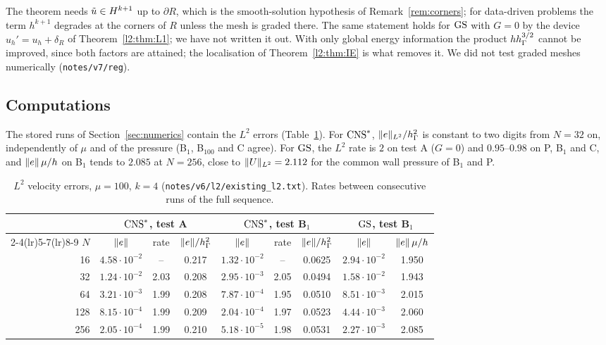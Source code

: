The theorem needs $\tilde u\in H^{k+1}$ up to $\partial R$, which is the smooth-solution hypothesis of Remark~\ref{rem:corners}; for data-driven problems the term $h^{k+1}$ degrades at the corners of $R$ unless the mesh is graded there. The same statement holds for $\mathrm{GS}$ with $G=0$ by the device $u_h'=u_h+\delta_R$ of Theorem~\ref{l2:thm:L1}; we have not written it out. With only global energy information the product $hh_\Gamma^{3/2}$ cannot be improved, since both factors are attained; the localisation of Theorem~\ref{l2:thm:IE} is what removes it. We did not test graded meshes numerically (\texttt{notes/v7/reg}).

\subsection{Computations}\label{l2:sec:num}

The stored runs of Section~\ref{sec:numerics} contain the $L^2$ errors (Table~\ref{l2:tab}). For $\mathrm{CNS}^\ast$, $\lVert e\rVert_{L^2}/h_\Gamma^2$ is constant to two digits from $N=32$ on, independently of $\mu$ and of the pressure (B$_1$, B$_{100}$ and C agree). For $\mathrm{GS}$, the $L^2$ rate is $2$ on test A ($G=0$) and $0.95$--$0.98$ on P, B$_1$ and C, and $\lVert e\rVert\,\mu/h$ on B$_1$ tends to $2.085$ at $N=256$, close to $\lVert U\rVert_{L^2}=2.112$ for the common wall pressure of B$_1$ and P.

\begin{table}[t]
\centering\small
\caption{$L^2$ velocity errors, $\mu=100$, $k=4$ (\texttt{notes/v6/l2/existing\_l2.txt}). Rates between consecutive runs of the full sequence.}\label{l2:tab}
\begin{tabular}{rcccccccc}
\toprule
 & \multicolumn{3}{c}{$\mathrm{CNS}^\ast$, test A} & \multicolumn{3}{c}{$\mathrm{CNS}^\ast$, test B$_1$} & \multicolumn{2}{c}{$\mathrm{GS}$, test B$_1$}\\
\cmidrule(lr){2-4}\cmidrule(lr){5-7}\cmidrule(lr){8-9}
$N$ & $\lVert e\rVert$ & rate & $\lVert e\rVert/h_\Gamma^2$ & $\lVert e\rVert$ & rate & $\lVert e\rVert/h_\Gamma^2$ & $\lVert e\rVert$ & $\lVert e\rVert\,\mu/h$\\
\midrule
16 & $4.58\cdot10^{-2}$ & -- & 0.217 & $1.32\cdot10^{-2}$ & -- & 0.0625 & $2.94\cdot10^{-2}$ & 1.950\\
32 & $1.24\cdot10^{-2}$ & 2.03 & 0.208 & $2.95\cdot10^{-3}$ & 2.05 & 0.0494 & $1.58\cdot10^{-2}$ & 1.943\\
64 & $3.21\cdot10^{-3}$ & 1.99 & 0.208 & $7.87\cdot10^{-4}$ & 1.95 & 0.0510 & $8.51\cdot10^{-3}$ & 2.015\\
128 & $8.15\cdot10^{-4}$ & 1.99 & 0.209 & $2.04\cdot10^{-4}$ & 1.97 & 0.0523 & $4.44\cdot10^{-3}$ & 2.060\\
256 & $2.05\cdot10^{-4}$ & 1.99 & 0.210 & $5.18\cdot10^{-5}$ & 1.98 & 0.0531 & $2.27\cdot10^{-3}$ & 2.085\\
\bottomrule
\end{tabular}
\end{table}

